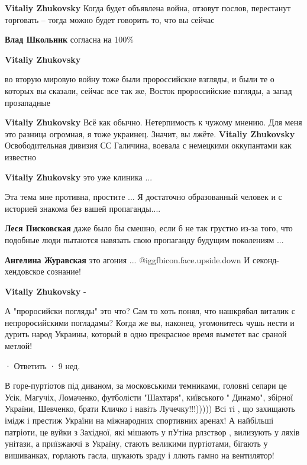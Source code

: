 \begin{itemize}
\begin{itemize}
\textbf{Vitaliy Zhukovsky} Когда будет объявлена война, отзовут послов, перестанут торговать – тогда можно будет говорить то, что вы сейчас

\textbf{Влад Школьник} согласна на 100\%

\textbf{Vitaliy Zhukovsky} 

во вторую мировую войну тоже были пророссийские взгляды, и были те о которых вы
сказали, сейчас все так же, Восток пророссийские взгляды, а запад прозападные

\textbf{Vitaliy Zhukovsky} Всё как обычно. Нетерпимость к чужому мнению. Для меня это разница огромная, я тоже украинец. Значит, вы лжёте.
\textbf{Vitaliy Zhukovsky} Освободительная дивизия СС Галичина, воевала с немецкими оккупантами как известно

\textbf{Vitaliy Zhukovsky} это уже клиника ...


Эта тема мне противна, простите ... Я достаточно образованный человек и с
историей знакома без вашей пропаганды....

\textbf{Леся Писковская} даже было бы смешно, если б не так грустно из-за того, что подобные люди пытаются навязать свою пропаганду будущим поколениям ...

\textbf{Ангелина Журавская} это агония ... @igg{fbicon.face.upside.down} И секонд-хендовское сознание!

\textbf{Vitaliy Zhukovsky} -

А "проросийски погляды" это что? Сам то хоть понял, что нашкрябал виталик с
непроросийскими погладамы? Когда же вы, наконец, угомонитесь чушь нести и дурить
народ Украины, который в одно прекрасное время выметет вас сраной метлой!

 · Ответить · 9 нед.

В горе-пуртіотов під диваном, за московськими темниками, головні сепари це
Усік, Магучіх, Ломаченко, футболісти "Шахтаря", київського " Динамо", збірної
України, Шевченко, брати Кличко і навіть Лучечку!!!))))) Всі ті , що захищають
імідж і престиж України на міжнародних спортивних аренах! А найбільші патріоти,
це вуйки з Західної, які мішають у пУтіна рлзствор , вилизують у ляхів унітази,
а приїзжаючі в Україну, стають великими пуртіотами, бігають у вишиванках,
горлають гасла, шукають зраду і ллють гамно на вентилятор!


\end{itemize}
\end{itemize}
